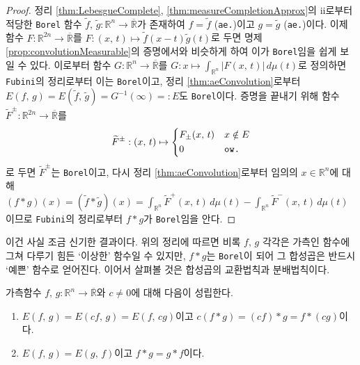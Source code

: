 \begin{proof}
    정리 \ref{thm:LebesgueComplete}, \ref{thm:measureCompletionApprox}의 ii로부터 적당한 \texttt{Borel} 함수 $\widetilde{f},\,\widetilde{g}:\mathbb{R}^n\to\overline{\mathbb{R}}$가 존재하여 $f=\widetilde{f}$ (\texttt{ae.})이고 $g=\widetilde{g}$ (\texttt{ae.})이다. 이제 함수 $F:\mathbb{R}^{2n}\to\overline{\mathbb{R}}$를 $F:(x,\,t)\mapsto\widetilde{f}(x-t)\widetilde{g}(t)$로 두면 명제 \ref{prop:convolutionMeasurable}의 증명에서와 비슷하게 하여 이가 \texttt{Borel}임을 쉽게 보일 수 있다. 이로부터 함수 $G:\mathbb{R}^n\to\overline{\mathbb{R}}$를 $G:x\mapsto\int_{\mathbb{R}^n}|F(x,\,t)|\,d\mu(t)$로 정의하면 \texttt{Fubini}의 정리로부터 이는 \texttt{Borel}이고, 정리 \ref{thm:aeConvolution}로부터 $E(f,\,g)=E(\widetilde{f},\,\widetilde{g})=G^{-1}(\infty)=:E$도 \texttt{Borel}이다. 증명을 끝내기 위해 함수 $\widetilde{F}^\pm:\mathbb{R}^{2n}\to\overline{\mathbb{R}}$를
    \begin{equation*}
        \widetilde{F}^\pm:(x,\,t)\mapsto
        \begin{dcases*}
            F_\pm(x,\,t)&$x\notin E$\\
            0&\texttt{ow.}
        \end{dcases*}
    \end{equation*}
    로 두면 $\widetilde{F}^\pm$는 \texttt{Borel}이고, 다시 정리 \ref{thm:aeConvolution}로부터 임의의 $x\in\mathbb{R}^n$에 대해 $(f*g)(x)=(\widetilde{f}*\widetilde{g})(x)=\int_{\mathbb{R}^n}\widetilde{F}^+(x,\,t)\,d\mu(t)-\int_{\mathbb{R}^n}\widetilde{F}^-(x,\,t)\,d\mu(t)$이므로 \texttt{Fubini}의 정리로부터 $f*g$가 \texttt{Borel}임을 안다.
\end{proof}

이건 사실 조금 신기한 결과이다. 위의 정리에 따르면 비록 $f,\,g$ 각각은 가측인 함수에 그쳐 다루기 힘든 `이상한' 함수일 수 있지만, $f*g$는 \texttt{Borel}이 되어 그 합성곱은 반드시 `예쁜' 함수로 얻어진다. 이어서 살펴볼 것은 합성곱의 교환법칙과 분배법칙이다.

\begin{theorem}\label{thm:convolutionCommut}
    가측함수 $f,\,g:\mathbb{R}^n\to\overline{\mathbb{R}}$와 $c\ne0$에 대해 다음이 성립한다.
    \begin{enumerate}
        \item $E(f,\,g)=E(cf,\,g)=E(f,\,cg)$이고 $c(f*g)=(cf)*g=f*(cg)$이다.
        \item $E(f,\,g)=E(g,\,f)$이고 $f*g=g*f$이다.
    \end{enumerate}
\end{theorem}

